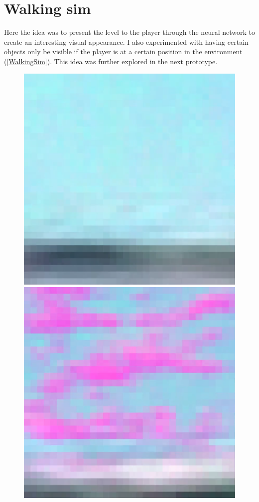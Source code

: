 \section{Walking sim}
Here the idea was to present the level to the player through the neural network to create an interesting visual appearance. I also experimented with having certain objects only be visible if the player is at a certain position in the environment (\cref{WalkingSim}). This idea was further explored in the next prototype.

\begin{figure}[p]
  \centering
  \includegraphics[width=\imgWidth]{images/workflow/WalkingSimNothing.png} \\[\picVdist]
  \includegraphics[width=\imgWidth]{images/workflow/WalkingSimCloud.png}

\end{figure}
